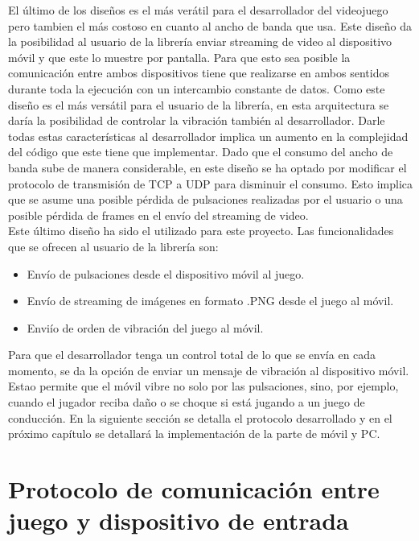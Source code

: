 El \'ultimo de los dise\~nos es el m\'as ver\'atil para el desarrollador del videojuego pero tambien el m\'as costoso en cuanto al ancho de banda que usa. Este dise\~no da la posibilidad al usuario de la librer\'ia enviar streaming de video al dispositivo m\'ovil y que este lo muestre por pantalla. Para que esto sea posible la comunicaci\'on entre ambos dispositivos tiene que realizarse en ambos sentidos durante toda la ejecuci\'on con un intercambio constante de datos. Como este dise\~no es el m\'as vers\'atil para el usuario de la librer\'ia, en esta arquitectura se dar\'ia la posibilidad de controlar la vibraci\'on tambi\'en al desarrollador. Darle todas estas caracter\'isticas al desarrollador implica un aumento en la complejidad del c\'odigo que este tiene que implementar. Dado que el consumo del ancho de banda sube de manera considerable, en este dise\~no se ha optado por modificar el protocolo de transmisi\'on de TCP a UDP para disminuir el consumo. Esto implica que se asume una posible p\'erdida de pulsaciones realizadas por el usuario o una posible p\'erdida de frames en el env\'io del streaming de video.\\

Este \'ultimo dise\~no ha sido el utilizado para este proyecto. Las funcionalidades que se ofrecen al usuario de la librer\'ia son:

\begin {itemize}
\item Env\'io de pulsaciones desde el dispositivo m\'ovil al juego.
\item Env\'io de streaming de im\'agenes en formato .PNG desde el juego al m\'ovil.
\item Envi\'io de orden de vibraci\'on del juego al m\'ovil.
\end {itemize}

Para que el desarrollador tenga un control total de lo que se env\'ia en cada momento, se da la opci\'on de enviar un mensaje de vibraci\'on al dispositivo m\'ovil. Estao permite que el m\'ovil vibre no solo por las pulsaciones, sino, por ejemplo, cuando el jugador reciba da\~no o se choque si est\'a jugando a un juego de conducci\'on. En la siguiente secci\'on se detalla el protocolo desarrollado y en el pr\'oximo cap\'itulo se detallar\'a la implementaci\'on de la parte de m\'ovil y PC.


\section{Protocolo de comunicaci\'on entre juego y dispositivo de entrada}

